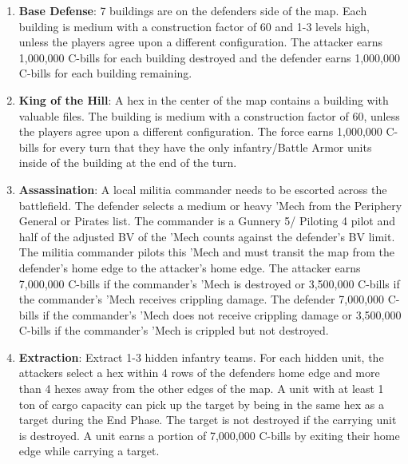 \begin{enumerate}
\item {\bfseries Base Defense}: 7 buildings are on the defenders side of the map.
Each building is medium with a construction factor of 60 and 1-3 levels high, unless the players agree upon a different configuration.
The attacker earns 1,000,000 C-bills for each building destroyed and the defender earns 1,000,000 C-bills for each building remaining.

\item {\bfseries King of the Hill}: A hex in the center of the map contains a building with valuable files.
The building is medium with a construction factor of 60, unless the players agree upon a different configuration.
The force earns 1,000,000 C-bills for every turn that they have the only infantry/Battle Armor units inside of the building at the end of the turn.

\item {\bfseries Assassination}: A local militia commander needs to be escorted across the battlefield.
The defender selects a medium or heavy 'Mech from the Periphery General or Pirates list.
The commander is a Gunnery 5/ Piloting 4 pilot and half of the adjusted BV of the 'Mech counts against the defender's BV limit.
The militia commander pilots this 'Mech and must transit the map from the defender's home edge to the attacker's home edge.
The attacker earns 7,000,000 C-bills if the commander's 'Mech is destroyed or 3,500,000 C-bills if the commander's 'Mech receives crippling damage.
The defender 7,000,000 C-bills if the commander's 'Mech does not receive crippling damage  or 3,500,000 C-bills if the commander's 'Mech is crippled but not destroyed.

\item {\bfseries Extraction}: Extract 1-3 hidden infantry teams.
For each hidden unit, the attackers select a hex within 4 rows of the defenders home edge and more than 4 hexes away from the other edges of the map.
A unit with at least 1 ton of cargo capacity can pick up the target by being in the same hex as a target during the End Phase.
The target is not destroyed if the carrying unit is destroyed.
A unit earns a portion of 7,000,000 C-bills by exiting their home edge while carrying a target.


\end{enumerate}
